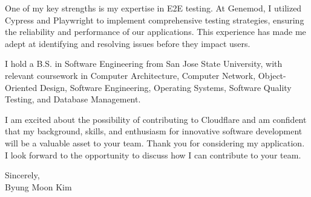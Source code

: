\documentclass[10pt]{article}
\begin{document}
One of my key strengths is my expertise in E2E testing. At Genemod, I utilized Cypress and Playwright to implement comprehensive testing strategies, ensuring the reliability and performance of our applications. This experience has made me adept at identifying and resolving issues before they impact users.
\vspace{0.5cm}

I hold a B.S. in Software Engineering from San Jose State University, with relevant coursework in Computer Architecture, Computer Network, Object-Oriented Design, Software Engineering, Operating Systems, Software Quality Testing, and Database Management.
\vspace{0.5cm}

I am excited about the possibility of contributing to Cloudflare and am confident that my background, skills, and enthusiasm for innovative software development will be a valuable asset to your team. Thank you for considering my application. I look forward to the opportunity to discuss how I can contribute to your team.
\vspace{0.5cm}

\noindent Sincerely, \\
\noindent Byung Moon Kim
\end{document}

